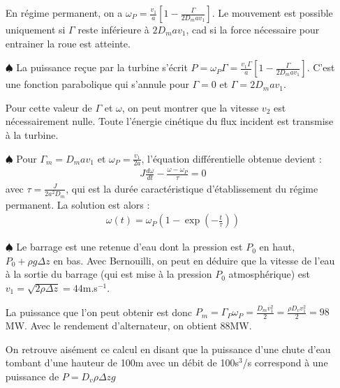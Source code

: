 \documentclass{report}
\begin{document}
\begin{itemize}
		\noindent{}
En régime permanent, on a $\omega_P=\frac{v_1}{a}\left[1-\frac{\Gamma}{2D_mav_1} \right]$. Le mouvement est possible uniquement si $\Gamma$ reste inférieure à $2D_mav_1$, cad si la force nécessaire pour entrainer la roue est atteinte.

	\item[$\spadesuit$] La puissance reçue par la turbine s'écrit $P=\omega_P\Gamma=\frac{v_1\Gamma}{a}\left[1-\frac{\Gamma}{2D_mav_1} \right]$. C'est une fonction parabolique qui s'annule pour $\Gamma=0$ et $\Gamma=2D_mav_1$. 
	
	\noindent{}

Pour cette valeur de $\Gamma$ et $\omega$, on peut montrer que la vitesse $v_2$ est nécessairement nulle. Toute l'énergie cinétique du flux incident est transmise à la turbine.

	\item[$\spadesuit$] Pour $\Gamma_m=D_mav_1$ et $\omega_P=\frac{v_1}{2a}$, l'équation différentielle obtenue devient :
	\begin{align*}
		J\frac{d\omega}{dt} - \frac{\omega-\omega_P}{\tau}=0
	\end{align*}
	avec $\tau=\frac{J}{2a^2D_m}$, qui est la durée caractéristique d'établissement du régime permanent. 
	La solution est alors :
	\begin{align*}
		\omega(t)=\omega_P\left( 1-\exp\left(-\frac{t}{\tau}\right) \right) 
	\end{align*}
	
	\item[$\spadesuit$] Le barrage est une retenue d'eau dont la pression est $P_0$ en haut, $P_0+\rho g\Delta z$ en bas. Avec Bernouilli, on peut en déduire que la vitesse de l'eau à la sortie du barrage (qui est mise à la pression $P_0$ atmosphérique) est $v_1=\sqrt{2\rho\Delta z}=44$m.s$^{-1}$.
	
	La puissance que l'on peut obtenir est donc $P_m=\Gamma_P\omega_P=\frac{D_mv_1^2}{2}=\frac{\rho D_vv_1^2}{2}=98$MW. Avec le rendement d'alternateur, on obtient 88MW.
	
	On retrouve aisément ce calcul en disant que la puissance d'une chute d'eau tombant d'une hauteur de 100m avec un débit de 100s$^3$/s correspond à une puissance de $P=D_v\rho\Delta z g$
	

\end{itemize}
\end{document}

